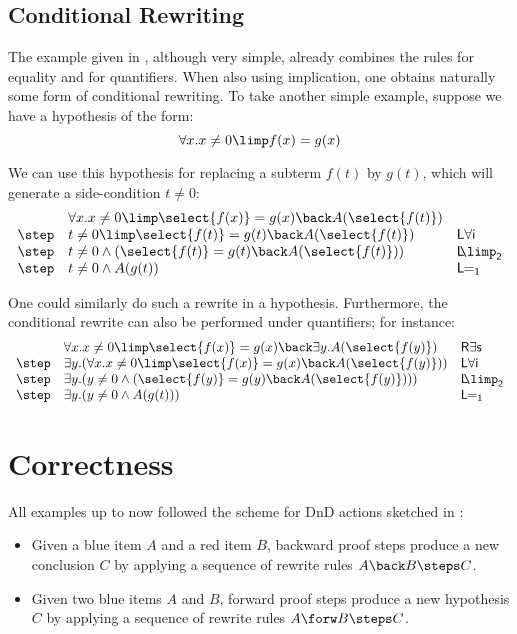\subsection{Conditional Rewriting}
The example given in , although very simple,
already combines the rules for equality and for quantifiers. When also
using implication, one obtains naturally some form of conditional
rewriting. To take another simple example, suppose we have a
hypothesis of the form:
$$\forall x. x\neq 0 \limp f(x) = g(x)$$

We can use this hypothesis for replacing a subterm $f(t)$ by $g(t)$,
which will generate a side-condition $t\neq 0$:
$$
\begin{array}{lll}
  &\forall x. x\neq 0 \limp \select{f(x)} = g(x) \back A(\select{f(t)}) &\\
  \step & t\neq 0 \limp \select{f(t)} = g(t) \back A(\select{f(t)}) &\mathsf{L \forall i}\\
  \step & t\neq 0 \land (\select{f(t)} = g(t) \back A(\select{f(t)})) & \mathsf{L\!\!\limp_2}\\
  \step &  t\neq 0 \land A(g(t)) &\mathsf{L\!\!=_1} \\
\end{array}$$

One could similarly do such a rewrite in a hypothesis. Furthermore,
the conditional rewrite can also be performed under quantifiers; for instance:
$$
\begin{array}{lll}
  &\forall x. x\neq 0 \limp \select{f(x)} = g(x) \back \exists y . A(\select{f(y)})
  &\mathsf{R \exists s}\\
  \step &\exists y. ( \forall x. x\neq 0 \limp \select{f(x)} = g(x) \back A(\select{f(y)})) &\mathsf{L \forall i}\\
  \step & \exists y. ( y\neq 0 \land ( \select{f(y)} = g(y) \back A(\select{f(y)}) )) &\mathsf{L\!\!\limp_2} \\
  \step & \exists y .( y\neq 0 \land A(g(t))) &\mathsf{L\!\!=_1} \\
\end{array}$$


\section{Correctness}

All examples up to now followed the scheme for DnD actions sketched in
:
\begin{itemize}
  \item Given a blue item $A$ and a red item $B$, backward proof steps produce a
  new conclusion $C$ by applying a sequence of rewrite rules $A \back B \steps
  C$.
  \item Given two blue items $A$ and $B$, forward proof steps produce a new
  hypothesis $C$ by applying a sequence of rewrite rules $A \forw B \steps C$.
\end{itemize}

